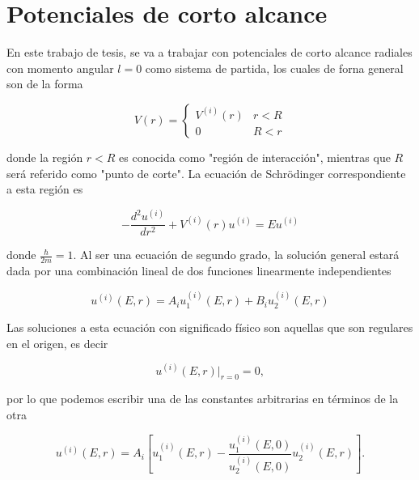 \chapter{Potenciales de corto alcance}
En este trabajo de tesis, se va a trabajar con potenciales de corto alcance radiales con momento angular $l = 0$ como sistema de partida, los cuales de forna general son de la forma

\begin{equation}
	V(r) = 
	\begin{cases}
	V^{(i)}(r) & r < R
	\\
	0 & R < r
	\end{cases} \label{PCA}
\end{equation}

donde la región $r < R$ es conocida como "región de interacción", mientras que $R$ será referido como "punto de corte". La ecuación de Schrödinger correspondiente a esta región es

\begin{equation*}
	-\frac{d^2 u^{(i)}}{dr^2} + V^{(i)}(r) u^{(i)} = E u^{(i)}
\end{equation*} 

donde $\frac{\hbar}{2m}=1$. Al ser una ecuación de segundo grado, la solución general estará dada por una combinación lineal de dos funciones linearmente independientes

\begin{equation*}
u^{(i)}(E,r) = A_i u^{(i)}_1(E,r) + B_i u_2^{(i)}(E,r)  
\end{equation*} 

Las soluciones a esta ecuación con significado físico son aquellas que son regulares en el origen, es decir

\begin{equation}
u^{(i)}(E,r)|_{r=0} = 0, \label{COPR}
\end{equation} 

por lo que podemos escribir una de las constantes arbitrarias en términos de la otra

\begin{equation*}
u^{(i)}(E,r) = A_i \left[ u^{(i)}_1(E,r) -  \frac{u^{(i)}_1(E,0)}{u_2^{(i)}(E,0)} u_2^{(i)}(E,r) \right].  
\end{equation*} 


